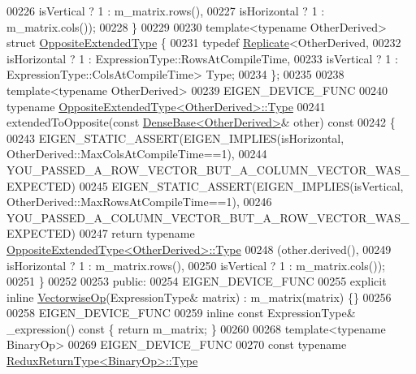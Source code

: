 \begin{DoxyCode}
00226                        isVertical   ? 1 : m\_matrix.rows(),
00227                        isHorizontal ? 1 : m\_matrix.cols());
00228     \}
00229 
00230     \textcolor{keyword}{template}<\textcolor{keyword}{typename} OtherDerived> \textcolor{keyword}{struct }\hyperlink{struct_eigen_1_1_vectorwise_op_1_1_opposite_extended_type}{OppositeExtendedType} \{
00231       \textcolor{keyword}{typedef} \hyperlink{group___core___module_class_eigen_1_1_replicate}{Replicate}<OtherDerived,
00232                         isHorizontal ? 1 : ExpressionType::RowsAtCompileTime,
00233                         isVertical   ? 1 : ExpressionType::ColsAtCompileTime> Type;
00234     \};
00235 
00238     \textcolor{keyword}{template}<\textcolor{keyword}{typename} OtherDerived>
00239     EIGEN\_DEVICE\_FUNC
00240     \textcolor{keyword}{typename} \hyperlink{group___core___module_class_eigen_1_1_replicate}{OppositeExtendedType<OtherDerived>::Type}
00241     extendedToOpposite(\textcolor{keyword}{const} \hyperlink{group___core___module_class_eigen_1_1_dense_base}{DenseBase<OtherDerived>}& other)\textcolor{keyword}{ const}
00242 \textcolor{keyword}{    }\{
00243       EIGEN\_STATIC\_ASSERT(EIGEN\_IMPLIES(isHorizontal, OtherDerived::MaxColsAtCompileTime==1),
00244                           YOU\_PASSED\_A\_ROW\_VECTOR\_BUT\_A\_COLUMN\_VECTOR\_WAS\_EXPECTED)
00245       EIGEN\_STATIC\_ASSERT(EIGEN\_IMPLIES(isVertical, OtherDerived::MaxRowsAtCompileTime==1),
00246                           YOU\_PASSED\_A\_COLUMN\_VECTOR\_BUT\_A\_ROW\_VECTOR\_WAS\_EXPECTED)
00247       \textcolor{keywordflow}{return} \textcolor{keyword}{typename} \hyperlink{group___core___module_class_eigen_1_1_replicate}{OppositeExtendedType<OtherDerived>::Type}
00248                       (other.derived(),
00249                        isHorizontal  ? 1 : m\_matrix.rows(),
00250                        isVertical    ? 1 : m\_matrix.cols());
00251     \}
00252 
00253   \textcolor{keyword}{public}:
00254     EIGEN\_DEVICE\_FUNC
00255     \textcolor{keyword}{explicit} \textcolor{keyword}{inline} \hyperlink{group___core___module_class_eigen_1_1_vectorwise_op}{VectorwiseOp}(ExpressionType& matrix) : m\_matrix(matrix) \{\}
00256 
00258     EIGEN\_DEVICE\_FUNC
00259     \textcolor{keyword}{inline} \textcolor{keyword}{const} ExpressionType& \_expression()\textcolor{keyword}{ const }\{ \textcolor{keywordflow}{return} m\_matrix; \}
00260 
00268     \textcolor{keyword}{template}<\textcolor{keyword}{typename} BinaryOp>
00269     EIGEN\_DEVICE\_FUNC
00270     \textcolor{keyword}{const} \textcolor{keyword}{typename} \hyperlink{group___core___module_class_eigen_1_1_partial_redux_expr}{ReduxReturnType<BinaryOp>::Type}

\end{DoxyCode}
